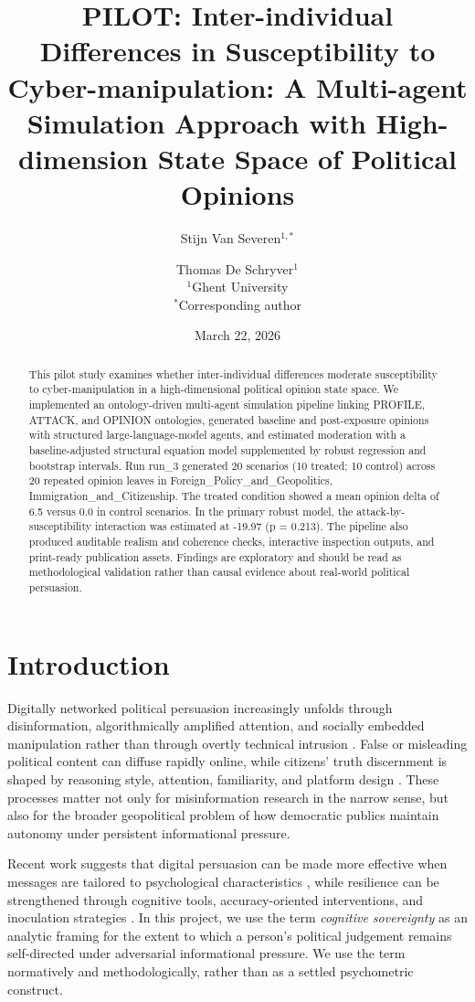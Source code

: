 \documentclass[11pt]{article}
\title{PILOT: Inter-individual Differences in Susceptibility to Cyber-manipulation: A Multi-agent Simulation Approach with High-dimension State Space of Political Opinions}
\author{Stijn Van Severen$^{1,*}$ \and Thomas De Schryver$^1$ \\
\normalsize $^1$Ghent University \\
\normalsize $^*$Corresponding author}
\date{March 22, 2026}
\begin{document}
\maketitle

\begin{abstract}
This pilot study examines whether inter-individual differences moderate susceptibility to cyber-manipulation in a high-dimensional political opinion state space. We implemented an ontology-driven multi-agent simulation pipeline linking PROFILE, ATTACK, and OPINION ontologies, generated baseline and post-exposure opinions with structured large-language-model agents, and estimated moderation with a baseline-adjusted structural equation model supplemented by robust regression and bootstrap intervals. Run run\_3 generated 20 scenarios (10 treated; 10 control) across 20 repeated opinion leaves in Foreign\_Policy\_and\_Geopolitics, Immigration\_and\_Citizenship. The treated condition showed a mean opinion delta of 6.5 versus 0.0 in control scenarios. In the primary robust model, the attack-by-susceptibility interaction was estimated at -19.97 (p = 0.213). The pipeline also produced auditable realism and coherence checks, interactive inspection outputs, and print-ready publication assets. Findings are exploratory and should be read as methodological validation rather than causal evidence about real-world political persuasion.
\end{abstract}

\section{Introduction}
Digitally networked political persuasion increasingly unfolds through disinformation, algorithmically amplified attention, and socially embedded manipulation rather than through overtly technical intrusion \citep{lazer2018science,vosoughi2018false,bennett2018disinformation}. False or misleading political content can diffuse rapidly online, while citizens' truth discernment is shaped by reasoning style, attention, familiarity, and platform design \citep{lewandowsky2017beyond,pennycook2019lazy,pennycook2021psychology}. These processes matter not only for misinformation research in the narrow sense, but also for the broader geopolitical problem of how democratic publics maintain autonomy under persistent informational pressure.

Recent work suggests that digital persuasion can be made more effective when messages are tailored to psychological characteristics \citep{matz2017psychological}, while resilience can be strengthened through cognitive tools, accuracy-oriented interventions, and inoculation strategies \citep{kozyreva2020citizens,pennycook2021accuracy,roozenbeek2022inoculation}. In this project, we use the term \textit{cognitive sovereignty} as an analytic framing for the extent to which a person's political judgement remains self-directed under adversarial informational pressure. We use the term normatively and methodologically, rather than as a settled psychometric construct.
\end{document}
